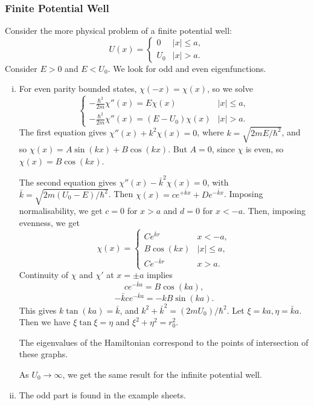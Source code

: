 \documentclass[12pt]{article}
\theoremstyle{definition}
\theoremstyle{remark}
\begin{document}
\subsubsection{Finite Potential Well}%
\label{subsub:finite_potential_well}

Consider the more physical problem of a finite potential well:
\[
	U(x) =
	\begin{cases}
		0 & |x| \leq a, \\
		U_0 & |x| > a.
	\end{cases}
\]
Consider $E > 0$ and $E < U_0$. We look for odd and even eigenfunctions.
\begin{enumerate}[(i)]
	\item For even parity bounded states, $\chi(-x) = \chi(x)$, so we solve
		\[
		\begin{cases}
			-\frac{\hbar^2}{2m} \chi''(x) = E \chi(x) & |x| \leq a,\\
			-\frac{\hbar^2}{2m}\chi''(x) = (E - U_0)\chi(x) & |x| > a.
		\end{cases}
		\]
		The first equation gives $\chi''(x) + k^2 \chi(x) = 0$, where $k = \sqrt{2mE/\hbar^2}$, and so $\chi(x) = A \sin (kx) + B \cos (kx)$. But $A = 0$, since $\chi$ is even, so $\chi(x) = B \cos (kx)$.

		The second equation gives $\chi''(x) - \bar k^2 \chi(x) = 0$, with $\bar k = \sqrt{2m(U_0 - E)/\hbar^2}$. Then $\chi(x) = ce^{+\bar k x} + D e^{- \bar k x}$. Imposing normalisability, we get $c = 0$ for $x > a$ and $d = 0$ for $x < -a$. Then, imposing evenness, we get
		\[
			\chi(x) =
			\begin{cases}
				C e^{\bar k r} & x < -a, \\
				B \cos (kx) & |x| \leq a, \\
				C e^{-\bar k r} &  x > a.
			\end{cases}
		\]
		Continuity of $\chi$ and $\chi'$ at $x = \pm a$ implies
		\[
			c e^{- \bar k a} = B \cos (k a)
		,\]
		\[
			- \bar k c e^{- \bar k a} = - k B \sin (k a)
		.\]
		This gives $k \tan (ka) = \bar k$, and $k^2 + \bar k^2 = (2mU_0)/\hbar^2$. Let $\xi = k a, \eta = \bar k a$. Then we have $\xi \tan \xi = \eta$ and $\xi^2 + \eta^2 = r_0^2$.

		The eigenvalues of the Hamiltonian correspond to the points of intersection of these graphs.

		As $U_0 \to \infty$, we get the same result for the infinite potential well.
	\item The odd part is found in the example sheets.
\end{enumerate}



\newpage

\printindex
\end{document}
